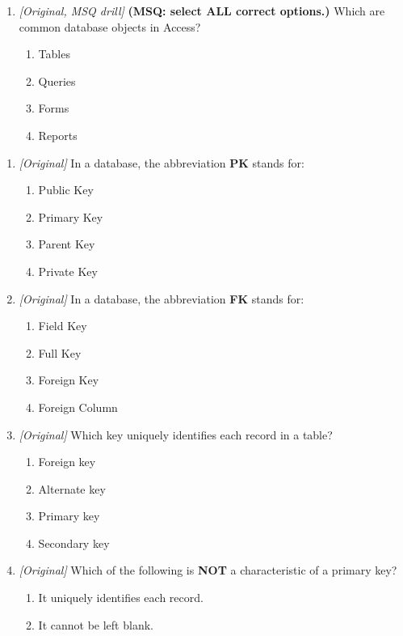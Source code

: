 \begin{enumerate}[label=\textbf{Q\arabic*.}, leftmargin=*]
\item \textit{[Original, MSQ drill]} \textbf{(MSQ: select ALL correct options.)} Which are common database objects in Access?
  \begin{enumerate}[label=\Alph*.]
\item Tables
   \item Queries
   \item Forms
   \item Reports
  \end{enumerate}

\end{enumerate}
\begin{enumerate}[label=\textbf{Q\arabic*.}, leftmargin=*]
\item \textit{[Original]} In a database, the abbreviation \textbf{PK} stands
  for:
  \begin{enumerate}[label=\Alph*.]
    \item Public Key
    \item Primary Key
    \item Parent Key
    \item Private Key
  \end{enumerate}
\item \textit{[Original]} In a database, the abbreviation \textbf{FK} stands
  for:
  \begin{enumerate}[label=\Alph*.]
    \item Field Key
    \item Full Key
    \item Foreign Key
    \item Foreign Column
  \end{enumerate}
\item \textit{[Original]} Which key uniquely identifies each record in a
  table?
  \begin{enumerate}[label=\Alph*.]
    \item Foreign key
    \item Alternate key
    \item Primary key
    \item Secondary key
  \end{enumerate}
\item \textit{[Original]} Which of the following is \textbf{NOT} a
  characteristic of a primary key?
  \begin{enumerate}[label=\Alph*.]
    \item It uniquely identifies each record.
    \item It cannot be left blank.

\end{enumerate}
\end{enumerate}
